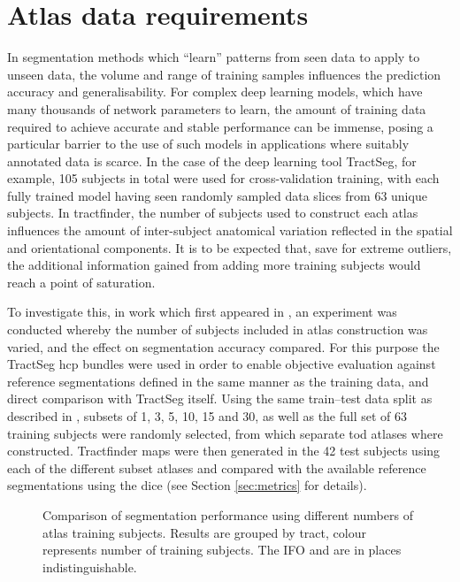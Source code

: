 \section{Atlas data requirements}\label{sec:ntrain}

In segmentation methods which ``learn'' patterns from seen data to apply to unseen data, the volume and range of training samples influences the prediction accuracy and generalisability.
For complex deep learning models, which have many thousands of network parameters to learn, the amount of training data required to achieve accurate and stable performance can be immense, posing a particular barrier to the use of such models in applications where suitably annotated data is scarce.
In the case of the deep learning tool TractSeg\autocite{Wasserthal2018}, for example, 105 subjects in total were used for cross-validation training, with each fully trained model having seen randomly sampled data slices from 63 unique subjects.
In tractfinder, the number of subjects used to construct each atlas influences the amount of inter-subject anatomical variation reflected in the spatial and orientational components.
It is to be expected that, save for extreme outliers, the additional information gained from adding more training subjects would reach a point of saturation.

To investigate this, in work which first appeared in \textcite{Young2023}, an experiment was conducted whereby the number of subjects included in atlas construction was varied, and the effect on segmentation accuracy compared.
For this purpose the TractSeg \gls{hcp} bundles were used in order to enable objective evaluation against reference segmentations defined in the same manner as the training data, and direct comparison with TractSeg itself.
Using the same train--test data split as described in \textcite{Wasserthal2018b}, subsets of 1, 3, 5, 10, 15 and 30, as well as the full set of 63 training subjects were randomly selected, from which separate \gls{tod} atlases where constructed.
Tractfinder maps were then generated in the 42 test subjects using each of the different subset atlases and compared with the available reference segmentations using the \gls{dice} (see Section \ref{sec:metrics} for details).

\begin{figure}[htb!]
    \centering
    \caption[Tractfinder performance against number of atlas training subjects]{Comparison of segmentation performance using different numbers of atlas training subjects. Results are grouped by tract, colour represents number of training subjects. The IFO and  are in places indistinguishable. }
    \label{fig:ntrain}
\end{figure}

